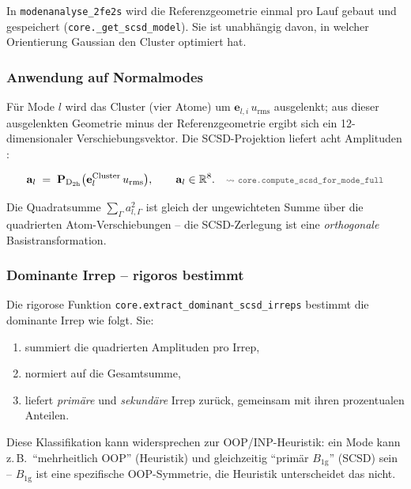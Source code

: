 \documentclass[11pt,a4paper,twoside]{article}
\newcommand{\evec}{\mathbf{e}}
\newcommand{\urms}{u_{\mathrm{rms}}}
\newcommand{\Bgi}[1]{B_{\mathrm{#1g}}}
\newcommand{\codref}[1]{%
  \quad\text{\textcolor{gray!70!black}{\footnotesize $\rightsquigarrow$~\texttt{#1}}}}
\theoremstyle{remark}
\begin{document}
In \texttt{modenanalyse\_2fe2s} wird die Referenzgeometrie einmal pro
Lauf gebaut und gespeichert (\texttt{core.\_get\_scsd\_model}). Sie ist
unabh\"angig davon, in welcher Orientierung Gaussian den Cluster
optimiert hat.

\subsubsection*{Anwendung auf Normalmodes}

F\"ur Mode $l$ wird das Cluster (vier Atome) um $\evec_{l,i}\,\urms$
ausgelenkt; aus dieser ausgelenkten Geometrie minus der
Referenzgeometrie ergibt sich ein 12-dimensionaler Verschiebungsvektor.
Die SCSD-Projektion liefert acht Amplituden \cite{Kingsbury2024}:

\begin{equation}
  \mathbf{a}_l \;=\;
  \mathbf{P}_{\mathrm{D}_{2\mathrm{h}}}\bigl(\evec_l^{\text{Cluster}} \,\urms\bigr) ,
  \qquad
  \mathbf{a}_l \in \mathbb{R}^8 .
  \codref{core.compute\_scsd\_for\_mode\_full}
  \label{eq:scsd-projection}
\end{equation}

Die Quadratsumme $\sum_\Gamma a_{l,\Gamma}^2$ ist gleich der
ungewichteten Summe \"uber die quadrierten Atom-Verschiebungen --
die SCSD-Zerlegung ist eine \emph{orthogonale} Basistransformation.

\subsubsection*{Dominante Irrep -- rigoros bestimmt}
\label{sec:scsd-rigoros}

Die rigorose Funktion \texttt{core.extract\_dominant\_scsd\_irreps}
bestimmt die dominante Irrep wie folgt. Sie:

\begin{enumerate}
  \item summiert die quadrierten Amplituden pro Irrep,
  \item normiert auf die Gesamtsumme,
  \item liefert \emph{prim\"are} und \emph{sekund\"are} Irrep zur\"uck,
        gemeinsam mit ihren prozentualen Anteilen.
\end{enumerate}

Diese Klassifikation kann widersprechen zur OOP/INP-Heuristik: ein
Mode kann z.\,B.\ "`mehrheitlich OOP"' (Heuristik) und gleichzeitig
"`prim\"ar $\Bgi{1}$"' (SCSD) sein -- $\Bgi{1}$ ist eine spezifische
OOP-Symmetrie, die Heuristik unterscheidet das nicht.
\end{document}
